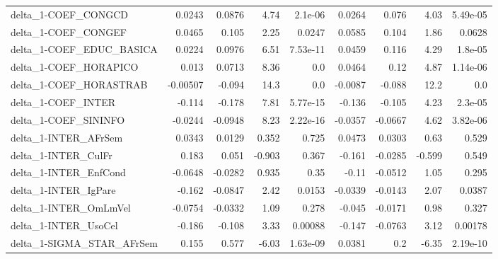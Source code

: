 \begin{tabular}{lrrrrrrrr}
delta\_1-COEF\_CONGCD                   &      0.0243 &       0.0876 &    4.74 &  2.1e-06 &     0.0264 &       0.076 &         4.03 &      5.49e-05 \\
delta\_1-COEF\_CONGEF                   &      0.0465 &        0.105 &    2.25 &   0.0247 &     0.0585 &       0.104 &         1.86 &        0.0628 \\
delta\_1-COEF\_EDUC\_BASICA              &      0.0224 &       0.0976 &    6.51 & 7.53e-11 &     0.0459 &       0.116 &         4.29 &       1.8e-05 \\
delta\_1-COEF\_HORAPICO                 &       0.013 &       0.0713 &    8.36 &      0.0 &     0.0464 &        0.12 &         4.87 &      1.14e-06 \\
delta\_1-COEF\_HORASTRAB                &    -0.00507 &       -0.094 &    14.3 &      0.0 &    -0.0087 &      -0.088 &         12.2 &           0.0 \\
delta\_1-COEF\_INTER                    &      -0.114 &       -0.178 &    7.81 & 5.77e-15 &     -0.136 &      -0.105 &         4.23 &       2.3e-05 \\
delta\_1-COEF\_SININFO                  &     -0.0244 &      -0.0948 &    8.23 & 2.22e-16 &    -0.0357 &     -0.0667 &         4.62 &      3.82e-06 \\
delta\_1-INTER\_AFrSem                  &      0.0343 &       0.0129 &   0.352 &    0.725 &     0.0473 &      0.0303 &         0.63 &         0.529 \\
delta\_1-INTER\_CulFr                   &       0.183 &        0.051 &  -0.903 &    0.367 &     -0.161 &     -0.0285 &       -0.599 &         0.549 \\
delta\_1-INTER\_EnfCond                 &     -0.0648 &      -0.0282 &   0.935 &     0.35 &      -0.11 &     -0.0512 &         1.05 &         0.295 \\
delta\_1-INTER\_IgPare                  &      -0.162 &      -0.0847 &    2.42 &   0.0153 &    -0.0339 &     -0.0143 &         2.07 &        0.0387 \\
delta\_1-INTER\_OmLmVel                 &     -0.0754 &      -0.0332 &    1.09 &    0.278 &     -0.045 &     -0.0171 &         0.98 &         0.327 \\
delta\_1-INTER\_UsoCel                  &      -0.186 &       -0.108 &    3.33 &  0.00088 &     -0.147 &     -0.0763 &         3.12 &       0.00178 \\
delta\_1-SIGMA\_STAR\_AFrSem             &       0.155 &        0.577 &   -6.03 & 1.63e-09 &     0.0381 &         0.2 &        -6.35 &      2.19e-10 \\

\end{tabular}
